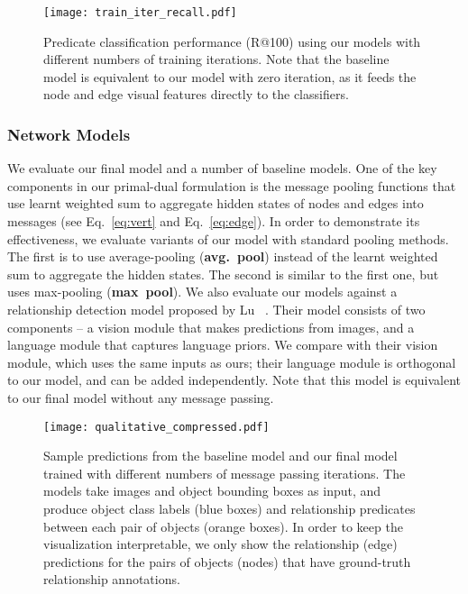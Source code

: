 \documentclass[10pt,twocolumn,letterpaper]{article}
\begin{document}
\begin{figure}[t!]
    \begin{center}
    \texttt{[image: train\_iter\_recall.pdf]}
\vspace{-20pt}
    \end{center}
\caption{Predicate classification performance (R@100) using our models with different numbers of training iterations.  Note that the baseline model is equivalent to our model with zero iteration, as it feeds the node and edge visual features directly to the classifiers.}
 \vspace{-10pt}

\label{fig:train_iter}
\end{figure}

 \vspace{-15pt}

\subsubsection{Network Models} 
\label{sec:models}
We evaluate our final model and a number of baseline models. One of the key
components in our primal-dual formulation is the message pooling functions that use learnt weighted sum to aggregate hidden states of nodes and edges into messages (see Eq.~\ref{eq:vert} and Eq.~\ref{eq:edge}). In order to demonstrate its effectiveness, we evaluate variants of our model with standard pooling methods. 
The first is to use average-pooling (\textbf{avg.~pool}) instead of the learnt weighted sum to aggregate the hidden states. The second is similar to the first one, but uses max-pooling (\textbf{max~pool}). We also evaluate our models against a relationship detection model proposed by Lu \etal~\cite{lu2016visual}. 
Their model consists of two components -- a vision module that makes predictions from images, and a language module that captures language priors. We compare with their vision module, which uses the same inputs as ours; their language module is orthogonal to our model, and can be added independently. Note that this model is equivalent to our final model without any message passing.



\begin{figure*}[t!]
\begin{center}
\texttt{[image: qualitative\_compressed.pdf]}
 \vspace{-15pt}
\end{center}
\caption{Sample predictions from the baseline model and our final model trained with different numbers of message passing iterations. The models take images and object bounding boxes as input, and produce object class labels (blue boxes) and relationship predicates between each pair of objects (orange boxes). In order to keep the visualization interpretable, we only show the relationship (edge) predictions for the pairs of objects (nodes) that have ground-truth relationship annotations. }
\label{fig:qualitative}
\end{figure*}
\end{document}
